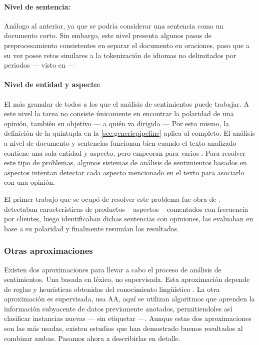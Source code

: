 \paragraph{Nivel de sentencia:} Análogo al anterior, ya que se podría considerar
una sentencia como un documento corto. Sin embargo, este nivel presenta algunos
pasos de preprocesamiento consistentes en separar el documento en oraciones,
paso que a su vez posee retos similares a la tokenización de idiomas no
delimitados por periodos --- visto en  ---

\paragraph{Nivel de entidad y aspecto:} El más granular de todos a los que el
análisis de sentimientos puede trabajar. A este nivel la tarea no consiste
únicamente en encontrar la polaridad de una opinión, también su objetivo --- a
quién va dirigida --- Por esto mismo, la definición de la quíntupla en la
\autoref{sec:genericpipeline} aplica al completo. El análisis a nivel de
documento y sentencias funcionan bien cuando el texto analizado contiene una
sola entidad y aspecto, pero empeoran para varios \cite{Feldman2013}. Para
resolver este tipo de problemas, algunos sistemas de análisis de sentimientos
basados en aspectos intentan detectar cada aspecto mencionado en el texto para
asociarlo con una opinión.

El primer trabajo que se ocupó de resolver este problema fue obra de
\citet{Hu2004}. \citeauthor{Hu2004} detectaban características de productos --
aspectos -- comentados con frecuencia por clientes, luego identificaban dichas
sentencias con opiniones, las evaluaban en base a su polaridad y finalmente
resumían los resultados.

\subsubsection{Otras aproximaciones}
\label{sec:approaches}

Existen dos aproximaciones para llevar a cabo el proceso de análisis de
sentimientos. Una basada en léxico, no supervisada. Esta aproximación depende
de reglas y heurísticas obtenidas del conocimiento lingüístico
\cite{VILARES2013}. La otra aproximación es supervisada, usa \ac{AA}, aquí se
utilizan algoritmos que aprenden la información subyacente de datos previamente
anotados, permitiendoles así clasificar instancias nuevas --- sin etiquetar
\cite{Pang2002} ---. Aunque estas dos aproximaciones son las más usadas, existen
estudios que han demostrado buenos resultados al combinar ambas. Pasamos ahora a
describirlas en detalle.

